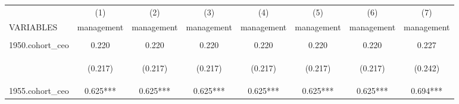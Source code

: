\begin{center}
\begin{tabular}{lccccccc} \hline
 & (1) & (2) & (3) & (4) & (5) & (6) & (7) \\
VARIABLES & management & management & management & management & management & management & management \\ \hline
\vspace{4pt} & \begin{footnotesize}\end{footnotesize} & \begin{footnotesize}\end{footnotesize} & \begin{footnotesize}\end{footnotesize} & \begin{footnotesize}\end{footnotesize} & \begin{footnotesize}\end{footnotesize} & \begin{footnotesize}\end{footnotesize} & \begin{footnotesize}\end{footnotesize} \\
1950.cohort\_ceo & 0.220 & 0.220 & 0.220 & 0.220 & 0.220 & 0.220 & 0.227 \\
\vspace{4pt} & \begin{footnotesize}(0.217)\end{footnotesize} & \begin{footnotesize}(0.217)\end{footnotesize} & \begin{footnotesize}(0.217)\end{footnotesize} & \begin{footnotesize}(0.217)\end{footnotesize} & \begin{footnotesize}(0.217)\end{footnotesize} & \begin{footnotesize}(0.217)\end{footnotesize} & \begin{footnotesize}(0.242)\end{footnotesize} \\
1955.cohort\_ceo & 0.625*** & 0.625*** & 0.625*** & 0.625*** & 0.625*** & 0.625*** & 0.694*** \\

\end{tabular}
\end{center}
